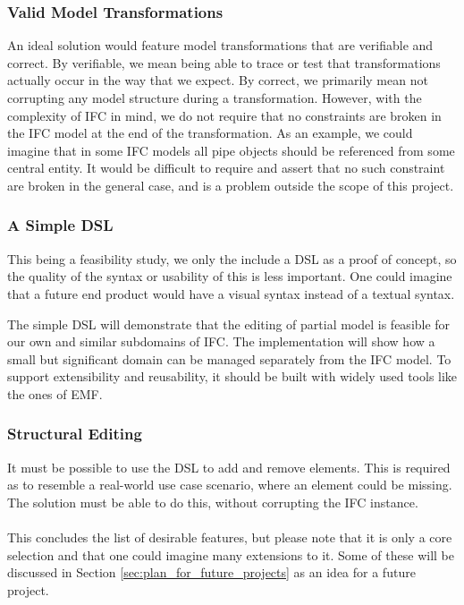 \subsubsection{Valid Model Transformations}
An ideal solution would feature model transformations that are verifiable and correct. By verifiable, we mean being able to trace or test that transformations actually occur in the way that we expect. By correct, we primarily mean not corrupting any model structure during a transformation.  However, with the complexity of IFC in mind, we do not require that no constraints are broken in the IFC model at the end of the transformation. As an example, we could imagine that in some IFC models all pipe objects should be referenced from some central entity. It would be difficult to require and assert that no such constraint are broken in the general case, and is a problem outside the scope of this project.

\subsubsection{A Simple DSL}
This being a feasibility study, we only the include a DSL as a proof of concept, so the quality of the syntax or usability of this is less important. One could imagine that a future end product would have a visual syntax instead of a textual syntax.

The simple DSL will demonstrate that the editing of partial model is feasible for our own and similar subdomains of IFC. The implementation will show how a small but significant domain can be managed separately from the IFC model. To support extensibility and reusability, it should be built with widely used tools like the ones of EMF.

\subsubsection{Structural Editing}
It must be possible to use the DSL to add and remove elements. This is required as to resemble a real-world use case scenario, where an element could be missing. The solution must be able to do this, without corrupting the IFC instance.
\paragraph{}
This concludes the list of desirable features, but please note that it is only a core selection and that one could imagine many extensions to it. Some of these will be discussed in Section \ref{sec:plan_for_future_projects} as an idea for a future project.

